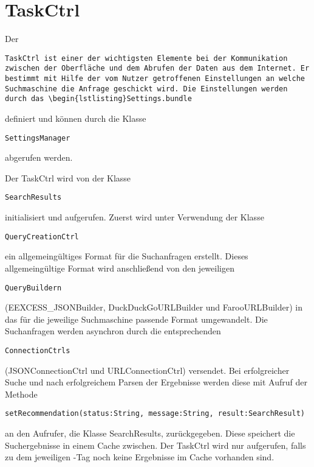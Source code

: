 
\section{TaskCtrl}

Der \begin{lstlisting}TaskCtrl ist einer der wichtigsten Elemente bei der Kommunikation zwischen der Oberfläche und dem Abrufen der Daten aus dem Internet. Er bestimmt mit Hilfe der vom Nutzer getroffenen Einstellungen an welche Suchmaschine die Anfrage geschickt wird. Die Einstellungen werden durch das \begin{lstlisting}Settings.bundle\end{lstlisting} definiert und können durch die Klasse \begin{lstlisting}SettingsManager\end{lstlisting} abgerufen werden. 

Der TaskCtrl wird von der Klasse \begin{lstlisting}SearchResults\end{lstlisting} initialisiert und aufgerufen. Zuerst wird unter Verwendung der Klasse \begin{lstlisting}QueryCreationCtrl\end{lstlisting} ein allgemeingültiges Format für die Suchanfragen erstellt. Dieses allgemeingültige Format wird anschließend von den jeweiligen \begin{lstlisting}QueryBuildern\end{lstlisting} (EEXCESS\_JSONBuilder, DuckDuckGoURLBuilder und FarooURLBuilder) in das für die jeweilige Suchmaschine passende Format umgewandelt. Die Suchanfragen werden asynchron durch die entsprechenden \begin{lstlisting}ConnectionCtrls\end{lstlisting} (JSONConnectionCtrl und URLConnectionCtrl) versendet. Bei erfolgreicher Suche und nach erfolgreichem Parsen der Ergebnisse werden diese mit Aufruf der Methode \begin{lstlisting}setRecommendation(status:String, message:String, result:SearchResult)\end{lstlisting} an den Aufrufer, die Klasse SearchResults, zurückgegeben. Diese speichert die Suchergebnisse in einem Cache zwischen. Der TaskCtrl wird nur aufgerufen, falls zu dem jeweiligen \SEARCH-Tag noch keine Ergebnisse im Cache vorhanden sind. 

